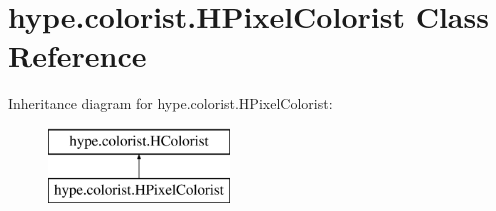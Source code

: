 \hypertarget{classhype_1_1colorist_1_1_h_pixel_colorist}{\section{hype.\-colorist.\-H\-Pixel\-Colorist Class Reference}
\label{classhype_1_1colorist_1_1_h_pixel_colorist}
}
Inheritance diagram for hype.\-colorist.\-H\-Pixel\-Colorist\-:\begin{figure}[H]
\begin{center}
\leavevmode
\includegraphics[height=2.000000cm]{classhype_1_1colorist_1_1_h_pixel_colorist}
\end{center}
\end{figure}

